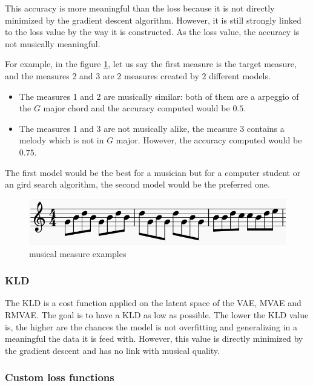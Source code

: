 \documentclass[12pt]{report}
\begin{document}
This accuracy is more meaningful than the loss because it is not directly minimized by the gradient descent algorithm.
However, it is still strongly linked to the loss value by the way it is constructed.
As the loss value, the accuracy is not musically meaningful.

For example, in the figure \ref{fig:acc-difference}, let us say the first measure is the target measure, and the measures 2 and 3 are 2 measures created by 2 different models.
\begin{itemize}
    \item  The measures 1 and 2 are musically similar: both of them are a arpeggio of the $G$ major chord and the accuracy computed would be $0.5$.
    \item The measures 1 and 3 are not musically alike, the measure 3 contains a melody which is not in $G$ major.
    However, the accuracy computed would be $0.75$.
\end{itemize}
The first model would be the best for a musician but for a computer student or an gird search algorithm, the second model would be the preferred one.

\begin{figure}[htbp]
    \centering
    \includegraphics[width=\textwidth]{images/metrics/training/acc.jpg}
    \caption{musical measure examples}
    \label{fig:acc-difference}
\end{figure}

\subsubsection{KLD}

The KLD is a cost function applied on the latent space of the VAE, MVAE and RMVAE.
The goal is to have a KLD as low as possible.
The lower the KLD value is, the higher are the chances the model is not overfitting and generalizing in a meaningful the data it is feed with.
However, this value is directly minimized by the gradient descent and has no link with musical quality.

\subsubsection{Custom loss functions}
\label{sec:evaluate:train:custom-loss}
\end{document}
